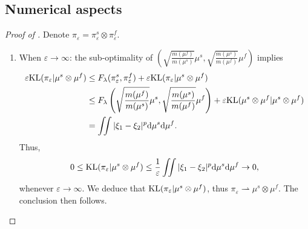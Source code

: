 \subsection{Numerical aspects}
\begin{proof}[Proof of ]
  Denote $\pi_{\varepsilon} = \pi_{\varepsilon}^s \otimes \pi_{\varepsilon}^f$.
  \begin{enumerate}
    \item When $\varepsilon \to \infty$: the sub-optimality of
    $\left( \sqrt{\frac{m(\mu^f)}{m(\mu^s)}} \mu^s, \sqrt{\frac{m(\mu^s)}{m(\mu^f)}} \mu^f \right)$
    implies
    \begin{equation}
      \begin{split}
        \varepsilon \text{KL}(\pi_{\varepsilon} \vert \mu^s \otimes \mu^f)
        &\leq F_{\lambda}(\pi_{\varepsilon}^s, \pi_{\varepsilon}^f) +
        \varepsilon \text{KL}(\pi_{\varepsilon} \vert \mu^s \otimes \mu^f) \\
        &\leq F_{\lambda} \left( \sqrt{\frac{m(\mu^f)}{m(\mu^s)}} \mu^s, \sqrt{\frac{m(\mu^s)}{m(\mu^f)}} \mu^f \right) +
        \varepsilon \text{KL}( \mu^s \otimes \mu^f \vert \mu^s \otimes \mu^f) \\
        &= \iint \vert \xi_1 - \xi_2 \vert^p \mathrm d\mu^s \mathrm d\mu^f.
      \end{split}
    \end{equation}
    Thus,
    \begin{equation}
      0 \leq \text{KL}(\pi_{\varepsilon} \vert \mu^s \otimes \mu^f)
      \leq \frac{1}{\varepsilon} \iint \vert \xi_1 - \xi_2 \vert^p
      \mathrm d\mu^s \mathrm d\mu^f \to 0,
    \end{equation}
    whenever $\varepsilon \to \infty$. We deduce that
    $\text{KL}(\pi_{\varepsilon} \vert \mu^s \otimes \mu^f)$,
    thus $\pi_{\varepsilon} \rightharpoonup \mu^s \otimes \mu^f$. The conclusion then follows.


\end{enumerate}
\end{proof}
